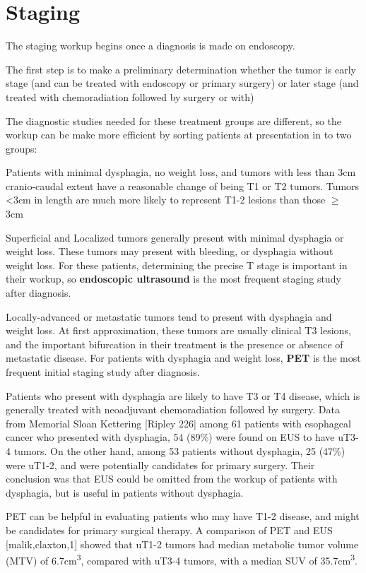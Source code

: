 \documentclass[
]{book}
\begin{document}
\hypertarget{staging}{%
\chapter{Staging}\label{staging}}

The staging workup begins once a diagnosis is made on endoscopy.

The first step is to make a preliminary determination whether the tumor is early stage (and can be treated with endoscopy or primary surgery) or later stage (and treated with chemoradiation followed by surgery or with)

The diagnostic studies needed for these treatment groups are different, so the workup can be make more efficient by sorting patients at presentation in to two groups:

Patients with minimal dysphagia, no weight loss, and tumors with less than 3cm cranio-caudal extent have a reasonable change of being T1 or T2 tumors. Tumors \textless3cm in length are much more likely to represent T1-2 lesions than those \(\geq\) 3cm\citep{hollis1116}

Superficial and Localized tumors generally present with minimal dysphagia or weight loss. These tumors may present with bleeding, or dysphagia without weight loss. For these patients, determining the precise T stage is important in their workup, so \textbf{endoscopic ultrasound} is the most frequent staging study after diagnosis.

Locally-advanced or metastatic tumors tend to present with dysphagia and weight loss. At first approximation, these tumors are usually clinical T3 lesions, and the important bifurcation in their treatment is the presence or absence of metastatic disease. For patients with dysphagia and weight loss, \textbf{PET} is the most frequent initial staging study after diagnosis.

Patients who present with dysphagia are likely to have T3 or T4 disease, which is generally treated with neoadjuvant chemoradiation followed by surgery. Data from Memorial Sloan Kettering {[}Ripley 226{]} among 61 patients with esophageal cancer who presented with dysphagia, 54 (89\%) were found on EUS to have uT3-4 tumors. On the other hand, among 53 patients without dysphagia, 25 (47\%) were uT1-2, and were potentially candidates for primary surgery. Their conclusion was that EUS could be omitted from the workup of patients with dysphagia, but is useful in patients without dysphagia.

PET can be helpful in evaluating patients who may have T1-2 disease, and might be candidates for primary surgical therapy. A comparison of PET and EUS {[}malik,claxton,1{]} showed that uT1-2 tumors had median metabolic tumor volume (MTV) of 6.7cm\textsuperscript{3}, compared with uT3-4 tumors, with a median SUV of 35.7cm\textsuperscript{3}.
\end{document}
